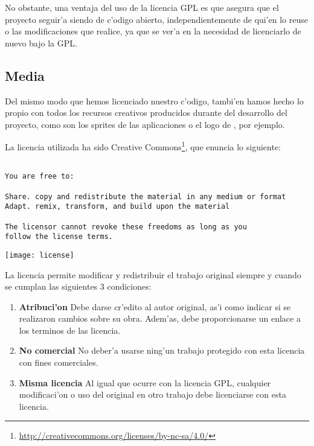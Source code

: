 No obstante, una ventaja del uso de la licencia GPL es que asegura que el proyecto seguir'a siendo de c'odigo abierto, 
independientemente de qui'en lo reuse o las modificaciones que realice, ya que se ver'a en la necesidad de licenciarlo 
de nuevo bajo la GPL.

\subsection{Media}
\label{sub:licencia_media}

Del mismo modo que hemos licenciado nuestro c'odigo, tambi'en hamos hecho lo propio con todos los recursos creativos 
producidos durante del desarrollo del proyecto, como son los sprites de las aplicaciones o el logo de \Nipponline{}, 
por ejemplo.

La licencia utilizada ha sido Creative Commons\footnote{\url{http://creativecommons.org/licenses/by-nc-sa/4.0/}}, que 
enuncia lo siguiente:

\begin{verbatim}

You are free to:

Share. copy and redistribute the material in any medium or format
Adapt. remix, transform, and build upon the material

The licensor cannot revoke these freedoms as long as you
follow the license terms.

\end{verbatim}

\begin{center}
\texttt{[image: license]}
\end{center}

La licencia permite modificar y redistribuir el trabajo original siempre y cuando se cumplan las siguientes 3 
condiciones:

\begin{enumerate}
\item \textbf{Atribuci'on} Debe darse cr'edito al autor original, as'i como indicar si se realizaron cambios sobre su 
obra. Adem'as, debe proporcionarse un enlace a los terminos de las licencia.
\item \textbf{No comercial} No deber'a usarse ning'un trabajo protegido con esta licencia con fines comerciales.
\item \textbf{Misma licencia} Al igual que ocurre con la licencia GPL, cualquier modificaci'on o uso del original en 
otro trabajo debe licenciarse con esta licencia.
\end{enumerate}

